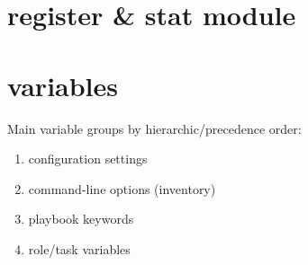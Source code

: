 \documentclass{refcard}
\begin{document}
\section{register \& stat module}

\section{variables}

Main variable groups by hierarchic/precedence order:
\begin{enumerate}
    \item configuration settings\vspace{-0.75em}
    \item command-line options (inventory)\vspace{-0.75em}
    \item playbook keywords\vspace{-0.75em}
    \item role/task variables
\end{enumerate}

\rflicense
\end{document}

